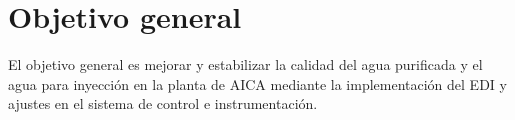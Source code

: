 \section*{Objetivo general}
El objetivo general es mejorar y estabilizar la calidad del agua purificada y el agua para inyección en la planta de AICA mediante la implementación del EDI y ajustes en el sistema de control e instrumentación.